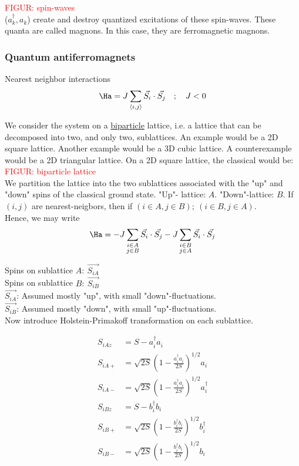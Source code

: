 \textcolor{red}{FIGUR: spin-waves} \\

($a_k^\dagger, a_k^{}$) create and destroy quantized excitations of these spin-waves. These quanta are called magnons. In this case, they are ferromagnetic magnons.

\subsubsection{Quantum antiferromagnets}

Nearest neighbor interactions
\begin{equation}
    \Ha = J \sum_{\langle i, j \rangle}\Vec{S_i}\cdot\Vec{S_j} \quad ; \quad J < 0
\end{equation}

We consider the system on a \uline{biparticle} lattice, i.e. a lattice that can be decomposed into two, and only two, sublattices. An example would be a 2D square lattice. Another example would be a 3D cubic lattice. A counterexample would be a 2D triangular lattice. On a 2D square lattice, the classical would be:\\

\textcolor{red}{FIGUR: biparticle lattice} \\

We partition the lattice into the two sublattices associated with the "up" and "down" spins of the classical ground state. "Up"- lattice: $A$. "Down"-lattice: $B$. If $(i, j)$ are nearest-neigbors, then if $(i \in A, j \in B); \ (i \in B, j \in A)$. \\
 Hence, we may write
\begin{equation}
    \Ha = - J \sum_{\substack{i \in A \\ j \in B}} \Vec{S_i} \cdot \Vec{S_j} - J \sum_{\substack{i \in B \\ j \in A}} \Vec{S_i} \cdot \Vec{S_j}
\end{equation}

Spins on sublattice $A: \ \Vec{S_{iA}}$ \\
Spins on sublattice $B: \ \Vec{S_{iB}}$ \\
$\Vec{S_{iA}}$: Assumed mostly "up", with small "down"-fluctuations. \\
$\Vec{S_{iB}}$: Assumed mostly "down", with small "up"-fluctuations. \\

Now introduce Holstein-Primakoff transformation on each sublattice.

\begin{align}
    S_{iAz} &= S - a_i^\dagger a_i^{} \\
    S_{iA+} &= \sqrt{2S} (1- \frac{a_i^\dagger a_i^{}}{2S})^{1/2} a_i \\
    S_{iA-} &= \sqrt{2S} (1- \frac{a_i^\dagger a_i^{}}{2S})^{1/2} a_i^\dagger \\
    S_{iBz} &= S - b_i^\dagger b_i^{} \\
    S_{iB+} &= \sqrt{2S} (1- \frac{b_i^\dagger b_i^{}}{2S})^{1/2} b_i^\dagger \\
    S_{iB-} &= \sqrt{2S} (1- \frac{b_i^\dagger b_i^{}}{2S})^{1/2} b_i \\
\end{align}

